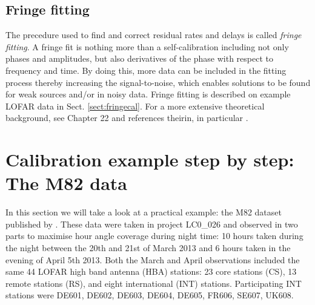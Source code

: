 \subsection{Fringe fitting}
The precedure used to find and correct residual rates and delays is called
\emph{fringe fitting}. A fringe fit is nothing more than a self-calibration
including not only phases and amplitudes, but also derivatives of the phase
with respect to frequency and time.  By doing this, more data can be included
in the fitting process thereby increasing the signal-to-noise, which enables
solutions to be found for weak sources and/or in noisy data. Fringe fitting is
described on example LOFAR data in Sect. \ref{sect:fringecal}. For a more
extensive theoretical background, see \cite{NRAO} Chapter 22 and references
theirin, in particular \cite{thompson}.



\section{Calibration example step by step: The M82 data}
\label{sect:handson}
In this section we will take a look at a practical example: the M82 dataset
published by \cite{varenius2014}. 
These data were taken in project LC0\_026 and observed in two parts to maximise
hour angle coverage during night time: 10 hours taken during the night between
the 20th and 21st of March 2013 and 6 hours taken in the evening of April 5th
2013.  Both the March and April observations included the same 44 LOFAR high
band antenna (HBA) stations: 23 core stations (CS), 13 remote stations (RS),
and eight international (INT) stations. Participating INT stations were DE601,
DE602, DE603, DE604, DE605, FR606, SE607, UK608.

